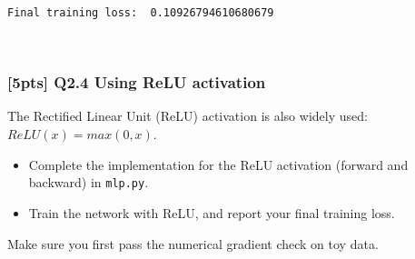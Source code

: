 \documentclass[11pt]{article}
\providecommand{\tightlist}{%
      \setlength{\itemsep}{0pt}\setlength{\parskip}{0pt}}
\begin{document}
    \begin{Verbatim}[commandchars=\\\{\}]
Final training loss:  0.10926794610680679
    \end{Verbatim}

    \begin{center}
    \end{center}
    { \hspace*{\fill} \\}
    
    \hypertarget{pts-q2.4-using-relu-activation}{%
\subsubsection{{[}5pts{]} Q2.4 Using ReLU
activation}\label{pts-q2.4-using-relu-activation}}

The Rectified Linear Unit (ReLU) activation is also widely used:
\(ReLU(x)=max(0,x)\).

\begin{itemize}
\tightlist
\item
  Complete the implementation for the ReLU activation (forward and
  backward) in \texttt{mlp.py}.
\item
  Train the network with ReLU, and report your final training loss.
\end{itemize}

Make sure you first pass the numerical gradient check on toy data.
\end{document}
